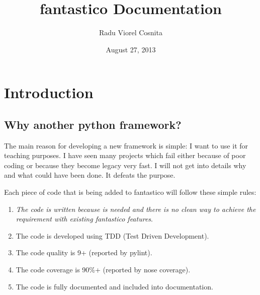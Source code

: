 \documentclass[letterpaper,10pt,english]{sphinxmanual}
\title{fantastico Documentation}
\date{August 27, 2013}
\author{Radu Viorel Cosnita}
\begin{document}
\maketitle
\tableofcontents
{}\label{index::doc}



\chapter{Introduction}
\label{intro:introduction}\label{intro::doc}\label{intro:fantastico-framework}

\section{Why another python framework?}
\label{intro:why-another-python-framework}
The main reason for developing a new framework is simple: I want to use it for teaching purposes. I have seen many projects which
fail either because of poor coding or because they become legacy very fast. I will not get into details why and what could have
been done. It defeats the purpose.

Each piece of code that is being added to fantastico will follow these simple rules:
\begin{enumerate}
\item {} 
\emph{The code is written because is needed and there is no clean way to achieve the requirement with existing fantastico features}.

\item {} 
The code is developed using TDD (Test Driven Development).

\item {} 
The code quality is 9+ (reported by pylint).

\item {} 
The code coverage is 90\%+ (reported by nose coverage).

\item {} 
The code is fully documented and included into documentation.

\end{enumerate}
\end{document}
